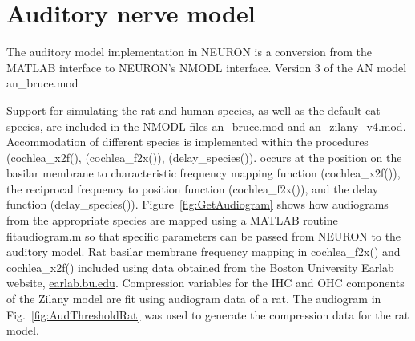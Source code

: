 \section{Auditory nerve model}

The auditory model implementation in NEURON is a conversion from the
MATLAB interface to NEURON's NMODL interface. Version 3 of the AN model \mbox{\textsf{an\_bruce.mod}}

Support for simulating the rat and human species, as well as the default cat species,  are included in the NMODL files
\mbox{\textsf{an\_bruce.mod}} and \mbox{\textsf{an\_zilany\_v4.mod}}.
Accommodation of different species is implemented within the procedures
(\mbox{\textsf{cochlea\_x2f()}}, (\mbox{\textsf{cochlea\_f2x()}}),
(\mbox{\textsf{delay\_species()}}). occurs at the position on the basilar
membrane to characteristic frequency mapping function
(\mbox{\textsf{cochlea\_x2f()}}), the reciprocal frequency to position function
(\mbox{\textsf{cochlea\_f2x()}}), and the delay function
(\mbox{\textsf{delay\_species()}}).  Figure~\ref{fig:GetAudiogram} shows how audiograms from the appropriate species are
mapped using a MATLAB routine \mbox{\textsf{fitaudiogram.m}} so that
specific parameters can be passed from NEURON to the auditory model.  Rat
basilar membrane frequency mapping in \mbox{\textsf{cochlea\_f2x()}} and
\mbox{\textsf{cochlea\_x2f()}} included using data obtained from the Boston
University Earlab website, \url{earlab.bu.edu}.  Compression variables for the
IHC and OHC components of the Zilany model are fit using audiogram data of a
rat.  The audiogram in Fig.~\ref{fig:AudThresholdRat} was used to generate the
compression data for the rat model.

\medskip{}




